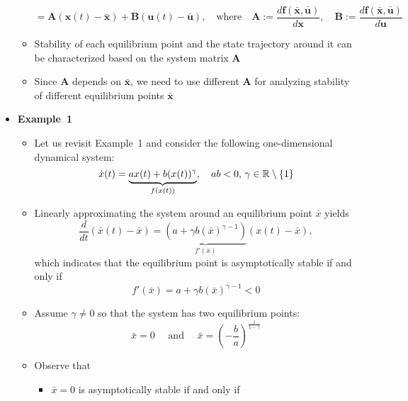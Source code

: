 \documentclass[12pt,a4paper]{article}
\begin{document}
\begin{itemize}
\begin{itemize}
\begin{equation}
      =
      \bm{A}(\bm{x}(t)-\bar{\bm{x}})
      +
      \bm{B}(\bm{u}(t)-\bar{\bm{u}}),
      \quad\text{where}\quad
      \bm{A} := \frac{d\bm{f}(\bar{\bm{x}},\bar{\bm{u}})}{d\bm{x}},
      \quad
      \bm{B} := \frac{d\bm{f}(\bar{\bm{x}},\bar{\bm{u}})}{d\bm{u}}
    \end{equation}
  \item Stability of each equilibrium point
    and the state trajectory around it can be characterized
    based on the system matrix $\bm{A}$
  \item Since $\bm{A}$ depends on $\bar{\bm{x}}$,
    we need to use different $\bm{A}$ for analyzing stability of different equilibrium points $\bar{\bm{x}}$
  \end{itemize}
  \clearpage

\item \textbf{Example~1}
  \begin{itemize}
  \item Let us revisit Example~1 and consider the following one-dimensional dynamical system:
    \begin{equation}\nonumber%
      \dot{x}(t) = \underbrace{ax(t) + b(x(t))^{\gamma}}_{f(x(t))},
      \quad ab < 0, \, \gamma\in \R\setminus\{1\}
    \end{equation}
  \item Linearly approximating the system around an equilibrium point $\bar{x}$ yields
    \begin{equation}\nonumber%
      \frac{d}{dt}(\bar{x}(t)-\bar{x})
      = \underbrace{\left(a + \gamma b(\bar{x})^{\gamma-1}\right)}_{f'(\bar{x})}(x(t)-\bar{x}),
    \end{equation}
    which indicates that the equilibrium point is asymptotically stable
    if and only if
    \begin{equation}\nonumber%
      f'(\bar{x}) = a + \gamma b(\bar{x})^{\gamma-1}< 0
    \end{equation}
  \item Assume $\gamma \neq 0$ so that 
    the system has two equilibrium points:
    \begin{equation}\nonumber%
      \bar{x} = 0
      \quad
      \text{ and }
      \quad
      \bar{x} = \left(- \frac{b}{a}\right)^{\frac{1}{1-\gamma}}
    \end{equation}
  \item Observe that
    \begin{itemize}
    \item $\bar{x}=0$ is asymptotically stable if and only if

\end{itemize}
\end{itemize}
\end{itemize}
\end{document}

